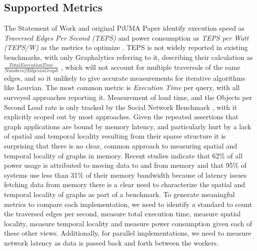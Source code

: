 \documentclass[letterpaper, 10pt]{article}
\begin{document}
\begin{multicols}{2}
{        \subsection{Supported Metrics}\label{section:metrics}
        The Statement of Work and original PiUMA Paper identify execution speed as \textit{Traversed Edges Per Second (TEPS)} and power consumption as \textit{TEPS per Watt (TEPS/W)} as the metrics to optimize \cite{Aananthakrishnan2020}. 
        TEPS is not widely reported in existing benchmarks, with only Graphalytics referring to it, describing their calculation as $\frac{Total Execution Time}{Number of Edges in Graph}$ \cite{Capota2015}, which will not account for multiple traversals of the same edges, and so it unlikely to give accurate measurements for iterative algorithms like Louvian.
        The most common metric is \textit{Execution Time} per query, with all surveyed approaches reporting it. 
        Measurement of load time, and the Objects per Second Load rate is only tracked by the Social Network Benchmark \cite{Angles2013}, with it explicitly scoped out by most approaches. 
        Given the repeated assertions that graph applications are bound by memory latency, and particularly hurt by a lack of spatial and temporal locality resulting from their sparse structure \cite{Mutlu2023,Ren2010,Blondel2008,Capota2015,Beamer2017} it is surprising that there is no clear, common approach to measuring spatial and temporal locality of graphs in memory.
        Recent studies indicate that 62\% of all power usage is attributed to moving data to and from memory \cite{Mutlu2023} and that 95\% of systems use less than 31\% of their memory bandwidth \cite{Kanev2015} because of latency issues fetching data from memory there is a clear need to characterize the spatial and temporal locality of graphs as part of a benchmark. 
        To generate meaningful metrics to compare each implementation, we need to identify a standard to count the traversed edges per second, measure total execution time, measure spatial locality, measure temporal locality and measure power consumption given each of these other views.
        Additionally, for parallel implementations, we need to measure network latency as data is passed back and forth between the workers. 

}
\end{multicols}
\end{document}
